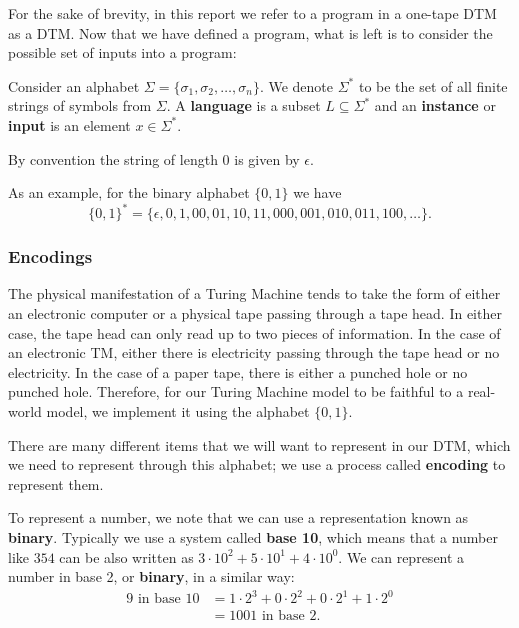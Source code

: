 For the sake of brevity, in this report we refer to a program in a one-tape DTM as a DTM. Now that we have defined a program, what is left is to consider the possible set of inputs into a program:

\begin{definition}
    Consider an alphabet \(\Sigma = \{\sigma_1,\sigma_2,\dots,\sigma_n\}\). We denote \(\Sigma^*\) to be the set of all finite strings of symbols from \(\Sigma\). A \textbf{language} is a subset \(L \subseteq \Sigma^*\) and an \textbf{instance} or \textbf{input} is an element $x \in \Sigma^*$.
\end{definition}

\begin{remark}
    By convention the string of length $0$ is given by $\epsilon$.
\end{remark}
As an example, for the binary alphabet \(\{0,1\}\) we have \[\{0,1\}^* = \{\epsilon, 0, 1, 00, 01, 10, 11, 000, 001, 010, 011, 100, \dots\}.\]

\subsubsection{Encodings}\label{sec:Encodings}
The physical manifestation of a Turing Machine tends to take the form of either an electronic computer or a physical tape passing through a tape head. In either case, the tape head can only read up to two pieces of information. In the case of an electronic TM, either there is electricity passing through the tape head or no electricity. In the case of a paper tape, there is either a punched hole or no punched hole. Therefore, for our Turing Machine model to be faithful to a real-world model, we implement it using the alphabet $\{0,1\}$.

There are many different items that we will want to represent in our DTM, which we need to represent through this alphabet; we use a process called \textbf{encoding} to represent them.

To represent a number, we note that we can use a representation known as \textbf{binary}. Typically we use a system called \textbf{base 10}, which means that a number like $354$ can be also written as $3 \cdot 10^2+5 \cdot 10^1 + 4 \cdot 10^0$. We can represent a number in base 2, or \textbf{binary}, in a similar way:
\begin{align*}
    9 \text{  in base } 10 &= 1 \cdot 2^3 + 0 \cdot 2^2 + 0 \cdot 2^1 + 1 \cdot 2^0\\
    &=1001 \text{ in base } 2.
\end{align*}

